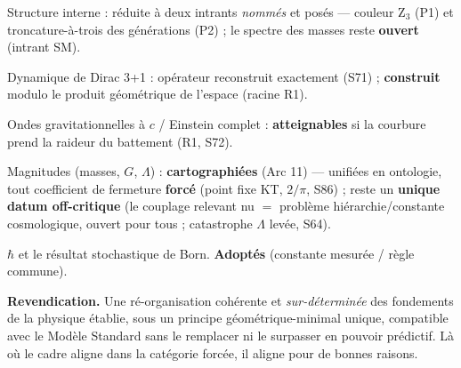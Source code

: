 \documentclass[11pt,a4paper]{article}
\theoremstyle{definition}
\begin{document}
\begin{description}[leftmargin=0.6cm,itemsep=2pt]
  \item Structure interne : réduite à deux intrants \emph{nommés} et posés — couleur Z$_3$ (P1) et troncature-à-trois des générations (P2) ; le spectre des masses reste \textbf{ouvert} (intrant SM).
  \item Dynamique de Dirac 3+1 : opérateur reconstruit exactement (S71) ; \textbf{construit} modulo le produit géométrique de l'espace (racine R1).
  \item Ondes gravitationnelles à $c$ / Einstein complet : \textbf{atteignables} si la courbure prend la raideur du battement (R1, S72).
  \item Magnitudes (masses, $G$, $\Lambda$) : \textbf{cartographiées} (Arc 11) — unifiées en ontologie, tout coefficient de fermeture \textbf{forcé} (point fixe KT, $2/\pi$, S86) ; reste un \textbf{unique datum off-critique} (le couplage relevant nu $=$ problème hiérarchie/constante cosmologique, ouvert pour tous ; catastrophe $\Lambda$ levée, S64).
  \item $\hbar$ et le résultat stochastique de Born. \textbf{Adoptés} (constante mesurée / règle commune).
\end{description}

\bigskip
\noindent\textbf{Revendication.} Une ré-organisation cohérente et \emph{sur-déterminée} des fondements de la physique établie, sous un principe géométrique-minimal unique, compatible avec le Modèle Standard sans le remplacer ni le surpasser en pouvoir prédictif. Là où le cadre aligne dans la catégorie forcée, il aligne pour de bonnes raisons.
\end{document}
